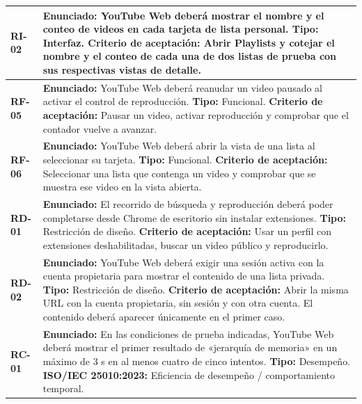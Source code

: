 \documentclass[11pt,a4paper]{article}
\begin{document}
\begin{longtable}{|p{}|p{}|}
\textbf{RI-02} & \textbf{Enunciado:} YouTube Web deberá mostrar el nombre y el conteo de videos en cada tarjeta de lista personal.\newline
\textbf{Tipo:} Interfaz.\newline
\textbf{Criterio de aceptación:} Abrir Playlists y cotejar el nombre y el conteo de cada una de dos listas de prueba con sus respectivas vistas de detalle. \\ \hline
\textbf{RF-05} & \textbf{Enunciado:} YouTube Web deberá reanudar un video pausado al activar el control de reproducción.\newline
\textbf{Tipo:} Funcional.\newline
\textbf{Criterio de aceptación:} Pausar un video, activar reproducción y comprobar que el contador vuelve a avanzar. \\ \hline
\textbf{RF-06} & \textbf{Enunciado:} YouTube Web deberá abrir la vista de una lista al seleccionar su tarjeta.\newline
\textbf{Tipo:} Funcional.\newline
\textbf{Criterio de aceptación:} Seleccionar una lista que contenga un video y comprobar que se muestra ese video en la vista abierta. \\ \hline
\textbf{RD-01} & \textbf{Enunciado:} El recorrido de búsqueda y reproducción deberá poder completarse desde Chrome de escritorio sin instalar extensiones.\newline
\textbf{Tipo:} Restricción de diseño.\newline
\textbf{Criterio de aceptación:} Usar un perfil con extensiones deshabilitadas, buscar un video público y reproducirlo. \\ \hline
\textbf{RD-02} & \textbf{Enunciado:} YouTube Web deberá exigir una sesión activa con la cuenta propietaria para mostrar el contenido de una lista privada.\newline
\textbf{Tipo:} Restricción de diseño.\newline
\textbf{Criterio de aceptación:} Abrir la misma URL con la cuenta propietaria, sin sesión y con otra cuenta. El contenido deberá aparecer únicamente en el primer caso. \\ \hline
\textbf{RC-01} & \textbf{Enunciado:} En las condiciones de prueba indicadas, YouTube Web deberá mostrar el primer resultado de «jerarquía de memoria» en un máximo de 3 s en al menos cuatro de cinco intentos.\newline
\textbf{Tipo:} Desempeño.\newline
\textbf{ISO/IEC 25010:2023:} Eficiencia de desempeño / comportamiento temporal.\newline

\end{longtable}
\end{document}
